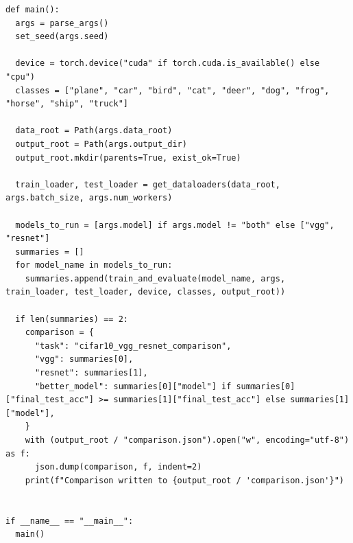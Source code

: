 \documentclass[12pt,a4paper]{ctexart}
\begin{document}
\begin{lstlisting}
def main():
  args = parse_args()
  set_seed(args.seed)

  device = torch.device("cuda" if torch.cuda.is_available() else "cpu")
  classes = ["plane", "car", "bird", "cat", "deer", "dog", "frog", "horse", "ship", "truck"]

  data_root = Path(args.data_root)
  output_root = Path(args.output_dir)
  output_root.mkdir(parents=True, exist_ok=True)

  train_loader, test_loader = get_dataloaders(data_root, args.batch_size, args.num_workers)

  models_to_run = [args.model] if args.model != "both" else ["vgg", "resnet"]
  summaries = []
  for model_name in models_to_run:
    summaries.append(train_and_evaluate(model_name, args, train_loader, test_loader, device, classes, output_root))

  if len(summaries) == 2:
    comparison = {
      "task": "cifar10_vgg_resnet_comparison",
      "vgg": summaries[0],
      "resnet": summaries[1],
      "better_model": summaries[0]["model"] if summaries[0]["final_test_acc"] >= summaries[1]["final_test_acc"] else summaries[1]["model"],
    }
    with (output_root / "comparison.json").open("w", encoding="utf-8") as f:
      json.dump(comparison, f, indent=2)
    print(f"Comparison written to {output_root / 'comparison.json'}")


if __name__ == "__main__":
  main()
\end{lstlisting}
\end{document}
